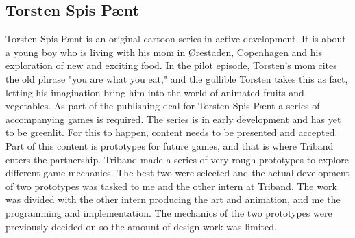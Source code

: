 \subsection{Torsten Spis P{{\ae}}nt}
Torsten Spis P{\ae}nt is an original cartoon series in active development. It is about a young boy who is living with his mom in {\O}restaden, Copenhagen and his exploration of new and exciting food. In the pilot episode, Torsten's mom cites the old phrase "you are what you eat," and the gullible Torsten takes this as fact, letting his imagination bring him into the world of animated fruits and vegetables. \newline
As part of the publishing deal for Torsten Spis P{\ae}nt a series of accompanying games is required. The series is in early development and has yet to be greenlit. For this to happen, content needs to be presented and accepted. Part of this content is prototypes for future games, and that is where Triband enters the partnership. Triband made a series of very rough prototypes to explore different game mechanics. The best two were selected and the actual development of two prototypes was tasked to me and the other intern at Triband. The work was divided with the other intern producing the art and animation, and me the programming and implementation. The mechanics of the two prototypes were previously decided on so the amount of design work was limited.

